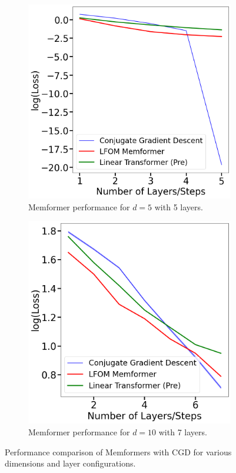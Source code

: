 \documentclass[11pt]{article}
\numberwithin{equation}{section}
\begin{document}
\begin{figure}[htbp]
  \centering
  \begin{subfigure}[b]{0.48\textwidth}
    \centering
    \includegraphics[width=\textwidth]{Layers=5d=5.png}
    \caption{Memformer performance for \( d = 5 \) with 5 layers.}
    \label{fig:layers5}
  \end{subfigure}
  \hfill
  \begin{subfigure}[b]{0.48\textwidth}
    \centering
    \includegraphics[width=\textwidth]{Layers=7d=10.png}
    \caption{Memformer performance for \( d = 10 \) with 7 layers.}
    \label{fig:layers7}
  \end{subfigure}
  \caption{Performance comparison of Memformers with CGD for various dimensions and layer configurations.}
  \label{fig:Memformer_experiments}
\end{figure}
\end{document}
